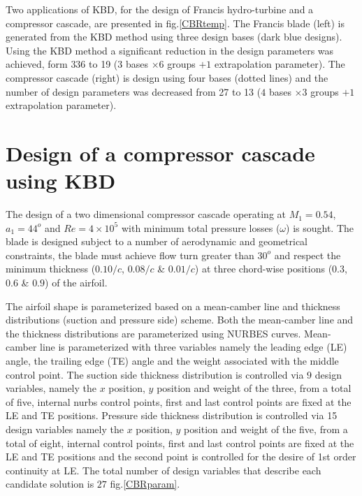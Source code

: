 
Two applications of KBD, for the design of Francis hydro-turbine and a compressor cascade, are presented in fig.\ref{CBRtemp}. The Francis blade (left) is generated from the KBD method using three design bases (dark blue designs). Using the KBD method a significant  reduction in the design parameters was achieved, form $336$ to 19  ($3$ bases $\times 6$ groups $+1$ extrapolation parameter). The compressor cascade (right) is design using four bases (dotted lines) and the number of design parameters was decreased from 27 to 13 ($4$ bases $\times 3$ groups $+1$ extrapolation parameter).

\section{Design of a compressor cascade using KBD}
\label{Drela1}
The design of a two dimensional compressor cascade operating at $M_1=0.54$, $a_1=44^o$ and $Re=4\times10^5$ with minimum total pressure losses ($\omega$) is sought. The blade is designed subject to a number of aerodynamic and geometrical constraints, the blade must achieve flow turn greater than $30^o$ and respect the minimum thickness ($0.10/c$, $0.08/c$ \& $0.01/c$) at three chord-wise positions ($0.3$, $0.6$ \& $0.9$) of the airfoil.     

The airfoil shape is parameterized based on a mean-camber line and thickness distributions (suction and pressure side) scheme. Both the mean-camber line and the thickness distributions are parameterized using NURBES curves.  Mean-camber line is parameterized with three variables namely the leading edge (LE) angle, the trailing edge (TE) angle and the weight associated with the middle control point. The suction side thickness distribution is controlled via $9$ design variables, namely the $x$ position, $y$ position and weight of the three, from a total of five, internal nurbs control points, first and last control points are fixed at the LE and TE positions. Pressure side thickness distribution is controlled via 15 design variables namely the $x$ position, $y$ position and weight of the five, from a total of eight, internal control points, first and last control points are fixed at the LE and TE positions and the second point is controlled for the desire of 1st order continuity at LE.  The total number of design variables that describe each candidate solution is $27$ fig.\ref{CBRparam}. 

